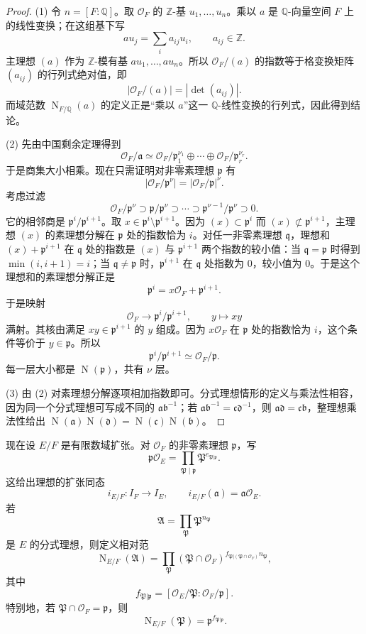 \documentclass[11pt,a4paper,openany]{ctexbook}
\numberwithin{equation}{chapter}
\newcommand{\Q}{\mathbb{Q}}
\newcommand{\Z}{\mathbb{Z}}
\newcommand{\OF}{\mathcal{O}_F}
\newcommand{\Nm}{\operatorname{N}}
\theoremstyle{plain}
\theoremstyle{definition}
\theoremstyle{remark}
\begin{document}
\begin{proof}
(1) 令 $n=[F:\Q]$。取 $\OF$ 的 $\Z$-基 $u_1,\dots,u_n$。乘以 $a$ 是 $\Q$-向量空间 $F$ 上的线性变换；在这组基下写
\[
au_j=\sum_i a_{ij}u_i,\qquad a_{ij}\in\Z.
\]
主理想 $(a)$ 作为 $\Z$-模有基 $au_1,\dots,au_n$。所以 $\OF/(a)$ 的指数等于格变换矩阵 $(a_{ij})$ 的行列式绝对值，即
\[
|\OF/(a)|=|\det(a_{ij})|.
\]
而域范数 $\Nm_{F/\Q}(a)$ 的定义正是“乘以 $a$”这一 $\Q$-线性变换的行列式，因此得到结论。

(2) 先由中国剩余定理得到
\[
\OF/\mathfrak a\simeq
\OF/\mathfrak p_1^{\nu_1}\oplus\cdots\oplus
\OF/\mathfrak p_r^{\nu_r}.
\]
于是商集大小相乘。现在只需证明对非零素理想 $\mathfrak p$ 有
\[
|\OF/\mathfrak p^\nu|=|\OF/\mathfrak p|^\nu.
\]
考虑过滤
\[
\OF/\mathfrak p^\nu\supset
\mathfrak p/\mathfrak p^\nu\supset\cdots\supset
\mathfrak p^{\nu-1}/\mathfrak p^\nu\supset0.
\]
它的相邻商是 $\mathfrak p^i/\mathfrak p^{i+1}$。取
$x\in\mathfrak p^i\setminus\mathfrak p^{i+1}$。因为 $(x)\subset\mathfrak p^i$ 而
$(x)\not\subset\mathfrak p^{i+1}$，主理想 $(x)$ 的素理想分解在 $\mathfrak p$ 处的指数恰为
$i$。对任一非零素理想 $\mathfrak q$，理想和 $(x)+\mathfrak p^{i+1}$ 在
$\mathfrak q$ 处的指数是 $(x)$ 与 $\mathfrak p^{i+1}$ 两个指数的较小值：当
$\mathfrak q=\mathfrak p$ 时得到 $\min(i,i+1)=i$；当
$\mathfrak q\ne\mathfrak p$ 时，$\mathfrak p^{i+1}$ 在 $\mathfrak q$ 处指数为 $0$，较小值为
$0$。于是这个理想和的素理想分解正是
\[
\mathfrak p^i=x\OF+\mathfrak p^{i+1}.
\]
于是映射
\[
\OF\longrightarrow \mathfrak p^i/\mathfrak p^{i+1},\qquad
y\longmapsto xy
\]
满射。其核由满足 $xy\in\mathfrak p^{i+1}$ 的 $y$ 组成。因为 $x\OF$ 在 $\mathfrak p$ 处的指数恰为 $i$，这个条件等价于 $y\in\mathfrak p$。所以
\[
\mathfrak p^i/\mathfrak p^{i+1}\simeq\OF/\mathfrak p.
\]
每一层大小都是 $\Nm(\mathfrak p)$，共有 $\nu$ 层。

(3) 由 (2) 对素理想分解逐项相加指数即可。分式理想情形的定义与乘法性相容，因为同一个分式理想可写成不同的 $\mathfrak a\mathfrak b^{-1}$；若
$\mathfrak a\mathfrak b^{-1}=\mathfrak c\mathfrak d^{-1}$，则
$\mathfrak a\mathfrak d=\mathfrak c\mathfrak b$，整理想乘法性给出
$\Nm(\mathfrak a)\Nm(\mathfrak d)=\Nm(\mathfrak c)\Nm(\mathfrak b)$。
\end{proof}

现在设 $E/F$ 是有限数域扩张。对 $\OF$ 的非零素理想 $\mathfrak p$，写
\[
\mathfrak p\mathcal O_E=\prod_{\mathfrak P\mid\mathfrak p}\mathfrak P^{e_{\mathfrak P|\mathfrak p}}.
\]
这给出理想的扩张同态
\[
i_{E/F}:I_F\longrightarrow I_E,\qquad
i_{E/F}(\mathfrak a)=\mathfrak a\mathcal O_E.
\]
若
\[
\mathfrak A=\prod_{\mathfrak P}\mathfrak P^{n_{\mathfrak P}}
\]
是 $E$ 的分式理想，则定义相对范
\[
\Nm_{E/F}(\mathfrak A)=
\prod_{\mathfrak P}
(\mathfrak P\cap\OF)^{f_{\mathfrak P|(\mathfrak P\cap\OF)}n_{\mathfrak P}},
\]
其中
\[
f_{\mathfrak P|\mathfrak p}
=[\mathcal O_E/\mathfrak P:\OF/\mathfrak p].
\]
特别地，若 $\mathfrak P\cap\OF=\mathfrak p$，则
\[
\Nm_{E/F}(\mathfrak P)=\mathfrak p^{f_{\mathfrak P|\mathfrak p}}.
\]
\end{document}
